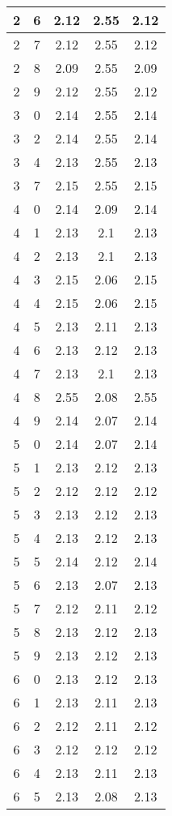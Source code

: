 \begin{longtable}{|c|c||c||c||c|}
	2 & 6 & 2.12 & 2.55 & 2.12 \\ \hline
	2 & 7 & 2.12 & 2.55 & 2.12 \\ \hline
	2 & 8 & 2.09 & 2.55 & 2.09 \\ \hline
	2 & 9 & 2.12 & 2.55 & 2.12 \\ \hline
	3 & 0 & 2.14 & 2.55 & 2.14 \\ \hline
	3 & 2 & 2.14 & 2.55 & 2.14 \\ \hline
	3 & 4 & 2.13 & 2.55 & 2.13 \\ \hline
	3 & 7 & 2.15 & 2.55 & 2.15 \\ \hline
	4 & 0 & 2.14 & 2.09 & 2.14 \\ \hline
	4 & 1 & 2.13 & 2.1 & 2.13 \\ \hline
	4 & 2 & 2.13 & 2.1 & 2.13 \\ \hline
	4 & 3 & 2.15 & 2.06 & 2.15 \\ \hline
	4 & 4 & 2.15 & 2.06 & 2.15 \\ \hline
	4 & 5 & 2.13 & 2.11 & 2.13 \\ \hline
	4 & 6 & 2.13 & 2.12 & 2.13 \\ \hline
	4 & 7 & 2.13 & 2.1 & 2.13 \\ \hline
	4 & 8 & 2.55 & 2.08 & 2.55 \\ \hline
	4 & 9 & 2.14 & 2.07 & 2.14 \\ \hline
	5 & 0 & 2.14 & 2.07 & 2.14 \\ \hline
	5 & 1 & 2.13 & 2.12 & 2.13 \\ \hline
	5 & 2 & 2.12 & 2.12 & 2.12 \\ \hline
	5 & 3 & 2.13 & 2.12 & 2.13 \\ \hline
	5 & 4 & 2.13 & 2.12 & 2.13 \\ \hline
	5 & 5 & 2.14 & 2.12 & 2.14 \\ \hline
	5 & 6 & 2.13 & 2.07 & 2.13 \\ \hline
	5 & 7 & 2.12 & 2.11 & 2.12 \\ \hline
	5 & 8 & 2.13 & 2.12 & 2.13 \\ \hline
	5 & 9 & 2.13 & 2.12 & 2.13 \\ \hline
	6 & 0 & 2.13 & 2.12 & 2.13 \\ \hline
	6 & 1 & 2.13 & 2.11 & 2.13 \\ \hline
	6 & 2 & 2.12 & 2.11 & 2.12 \\ \hline
	6 & 3 & 2.12 & 2.12 & 2.12 \\ \hline
	6 & 4 & 2.13 & 2.11 & 2.13 \\ \hline
	6 & 5 & 2.13 & 2.08 & 2.13 \\ \hline

\end{longtable}
